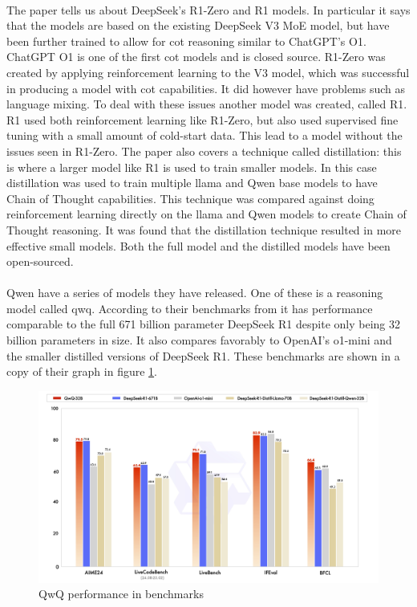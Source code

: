 \paragraph{} The paper \textcite{deepseek-ai_deepseek-r1_2025} tells us about DeepSeek's R1-Zero and  R1 models. In particular it says that the models are based on the existing DeepSeek V3 MoE model, but have been further trained to allow for \acrfull{cot} reasoning similar to ChatGPT's O1. ChatGPT O1 is one of the first \acrshort{cot} models and is closed source. R1-Zero was created by applying reinforcement learning to the V3 model, which was successful in producing a model with \acrshort{cot} capabilities. It did however have problems such as language mixing. To deal with these issues another model was created, called R1. R1 used both reinforcement learning like R1-Zero, but also used supervised fine tuning with a small amount of cold-start data. This lead to a model without the issues seen in R1-Zero. The paper also covers a technique called distillation: this is where a larger model like R1 is used to train smaller models. In this case distillation was used to train multiple \acrshort{llama} and Qwen base models to have Chain of Thought capabilities. This technique was compared against doing reinforcement learning directly on the \acrshort{llama} and Qwen models to create Chain of Thought reasoning. It was found that the distillation technique resulted in more effective small models. Both the full model and the distilled models have been open-sourced.

\paragraph{}Qwen have a series of models they have released. One of these is a reasoning model called qwq. According to their benchmarks from \textcite{} it has performance comparable to the full 671 billion parameter DeepSeek R1 despite only being 32 billion parameters in size. It also compares favorably to OpenAI's o1-mini and the smaller distilled versions of DeepSeek R1. These benchmarks are shown in a copy of their graph in figure \ref{fig:qwq-performance}.

\begin{figure}
    \centering
    \includegraphics[width=1\linewidth]{figure/qwq-32b-final.jpg}
    \caption{QwQ performance in benchmarks}
    \label{fig:qwq-performance}
\end{figure}

